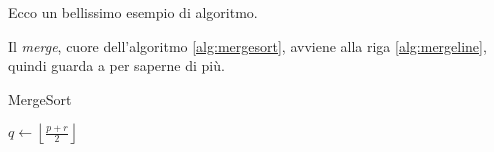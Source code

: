 Ecco un bellissimo esempio di algoritmo.

Il \textit{merge}, cuore dell'algoritmo \ref{alg:mergesort}, avviene alla riga \ref{alg:mergeline}, quindi guarda a  per saperne di più.

\begin{algorithm}[h]
\caption{MergeSort}\label{alg:mergesort}
\begin{algorithmic}[1]
        \State $ q \gets \left\lfloor \frac{p+r}{2} \right\rfloor $ 
        \State {} 
        \State {} 
        \State
            \label{alg:mergeline}
    \EndIf
    \EndProcedure
\end{algorithmic}
\end{algorithm}

